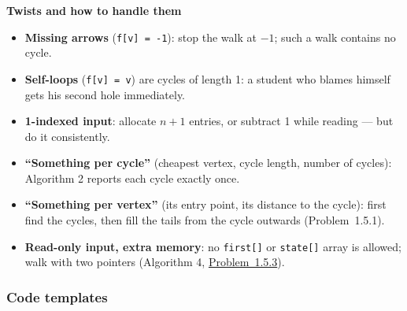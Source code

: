 \textbf{Twists and how to handle them}
\begin{itemize}[leftmargin=*]
    \item \textbf{Missing arrows} (\texttt{f[v] = -1}): stop the walk at $-1$; such a walk contains no cycle.
    \item \textbf{Self-loops} (\texttt{f[v] = v}) are cycles of length 1: a student who blames himself gets his second hole immediately.
    \item \textbf{1-indexed input}: allocate $n+1$ entries, or subtract 1 while reading --- but do it consistently.
    \item \textbf{``Something per cycle''} (cheapest vertex, cycle length, number of cycles): Algorithm 2 reports each cycle exactly once.
    \item \textbf{``Something per vertex''} (its entry point, its distance to the cycle): first find the cycles, then fill the tails from the cycle outwards (Problem~1.5.1).
    \item \textbf{Read-only input,  extra memory}: no \texttt{first[]} or \texttt{state[]} array is allowed; walk with two pointers (Algorithm 4, \hyperref[ssec:ch1-find-duplicate]{Problem~1.5.3}).
\end{itemize}

\subsubsection*{Code templates}

